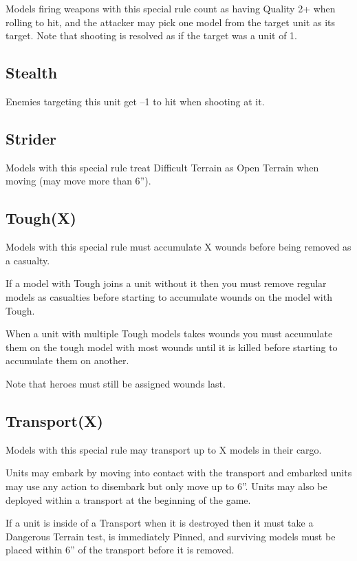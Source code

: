 \documentclass[9pt, a4paper]{extarticle}            %
\begin{document}
\begin{multicols*}{2}
Models firing weapons with this special rule count as having Quality 2+ when rolling to hit, and the attacker may pick one model from the target unit as its target.
Note that shooting is resolved as if the target was a unit of 1.

\subsection{Stealth}

Enemies targeting this unit get –1 to hit when shooting at it.

\subsection{Strider}

Models with this special rule treat Difficult Terrain as Open Terrain when moving (may move more than 6”).

\subsection{Tough(X)}

Models with this special rule must accumulate X wounds before being removed as a casualty.

If a model with Tough joins a unit without it then you must remove regular models as casualties before starting to accumulate wounds on the model with Tough.

When a unit with multiple Tough models takes wounds you must accumulate them on the tough model with most wounds until it is killed before starting to accumulate them on another.

Note that heroes must still be assigned wounds last.

\subsection{Transport(X)}

Models with this special rule may transport up to X models in their cargo.

Units may embark by moving into contact with the transport and embarked units may use any action to disembark but only move up to 6”. Units may also be deployed within a transport at the beginning of the game.

If a unit is inside of a Transport when it is destroyed then it must take a Dangerous Terrain test, is immediately Pinned, and surviving models must be placed within 6” of the transport before it is removed.

\end{multicols*}
\end{document}
